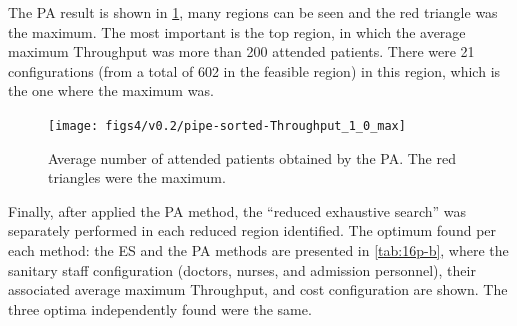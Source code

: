 \documentclass[11pt]{article} %
\begin{document}
The PA result is shown in \ref{subfig:pipe16-2}, many regions can
be seen and the red triangle was the maximum. The most important is
the top region, in which the average maximum Throughput was more than
200 attended patients. There were 21 configurations (from a total
of 602 in the feasible region) in this region, which is the one where
the maximum was.
\begin{figure}[H]
\centering{}\texttt{[image: figs4/v0.2/pipe-sorted-Throughput\_1\_0\_max]}\caption{Average number of attended patients obtained by the PA. The red triangles
were the maximum.\label{subfig:pipe16-2}}
\end{figure}

Finally, after  applied  the PA  method, the \textquotedblleft{}reduced exhaustive search\textquotedblright{}
was separately performed in each reduced region identified. The optimum
found per each method: the ES and the PA
methods are presented in \ref{tab:16p-b}, where the sanitary staff
configuration (doctors, nurses, and admission personnel), their associated
average maximum Throughput, and cost configuration are shown. The
three optima independently found were the same.
\end{document}
